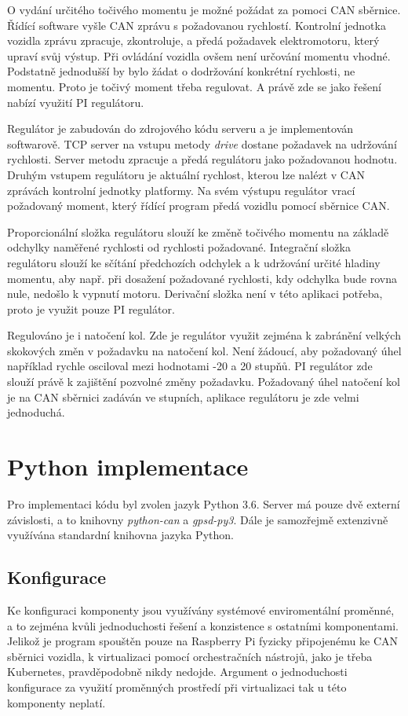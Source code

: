 \documentclass[czech, bachelor]{diploma}
\begin{document}
O vydání určitého točivého momentu je možné požádat za pomoci CAN sběrnice. Řídící software vyšle CAN zprávu s požadovanou
rychlostí. Kontrolní jednotka vozidla zprávu zpracuje, zkontroluje, a předá požadavek elektromotoru, který upraví svůj výstup.
Při ovládání vozidla ovšem není určování momentu vhodné. Podstatně jednodušší by bylo žádat o dodržování konkrétní rychlosti,
ne momentu. Proto je točivý moment třeba regulovat. A právě zde se jako řešení nabízí využití PI regulátoru.

Regulátor je zabudován do zdrojového kódu serveru a je implementován softwarově. TCP server na vstupu metody \emph{drive} dostane
požadavek na udržování rychlosti. Server metodu zpracuje a předá regulátoru jako požadovanou hodnotu. Druhým vstupem regulátoru
je aktuální rychlost, kterou lze nalézt v CAN zprávách kontrolní jednotky platformy. Na svém výstupu regulátor vrací požadovaný
moment, který řídící program předá vozidlu pomocí sběrnice CAN.

Proporcionální složka regulátoru slouží ke změně točivého momentu na základě odchylky naměřené rychlosti od rychlosti požadované.
Integrační složka regulátoru slouží ke sčítání předchozích odchylek a k udržování určité hladiny momentu, aby např. při dosažení
požadované rychlosti, kdy odchylka bude rovna nule, nedošlo k vypnutí motoru. Derivační složka není v této aplikaci potřeba, proto
je využit pouze PI regulátor.

Regulováno je i natočení kol. Zde je regulátor využit zejména k zabránění velkých skokových změn v požadavku na natočení kol. Není
žádoucí, aby požadovaný úhel například rychle osciloval mezi hodnotami -20 a 20 stupňů. PI regulátor zde slouží právě k zajištění
pozvolné změny požadavku. Požadovaný úhel natočení kol je na CAN sběrnici zadáván ve stupních, aplikace regulátoru je zde velmi
jednoduchá.

\section{Python implementace}

Pro implementaci kódu byl zvolen jazyk Python 3.6. Server má pouze dvě externí závislosti, a to knihovny \emph{python-can} a
\emph{gpsd-py3}. Dále je samozřejmě extenzivně využívána standardní knihovna jazyka Python.

\subsection{Konfigurace}
Ke konfiguraci komponenty jsou využívány systémové enviromentální proměnné, a to zejména kvůli jednoduchosti řešení a konzistence
s ostatními komponentami. Jelikož je program spouštěn pouze na Raspberry Pi fyzicky připojenému ke CAN sběrnici vozidla,
k virtualizaci pomocí orchestračních nástrojů, jako je třeba Kubernetes, pravděpodobně nikdy nedojde. Argument o jednoduchosti
konfigurace za využití proměnných prostředí při virtualizaci tak u této komponenty neplatí.
\end{document}
